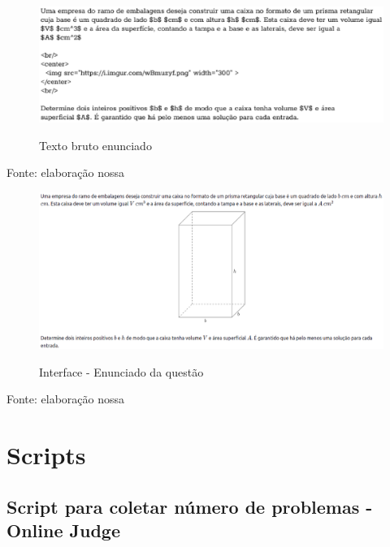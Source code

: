 \begin{apendicesenv}
\begin{figure}[H]
    \centering
    \caption{Texto bruto enunciado}
    \includegraphics[keepaspectratio=true,scale=0.65]{figuras/statementText.eps}
    \label{fig:statementText}
\end{figure}
\begin{center}
    {\tiny Fonte: elaboração nossa}
\end{center}

\begin{figure}[H]
    \centering
    \caption{Interface - Enunciado da questão}
    \includegraphics[keepaspectratio=true,scale=0.35]{figuras/questionStatement2.eps}
    \label{fig:questionStatement2}
\end{figure}
\begin{center}
    {\tiny Fonte: elaboração nossa}
\end{center}

\chapter{Scripts}
\label{appendix:b}

\section{Script para coletar número de problemas - Online Judge}
\label{appendix:script_oj}

\begin{lstlisting}[language=Python]


\end{lstlisting}
\end{apendicesenv}
